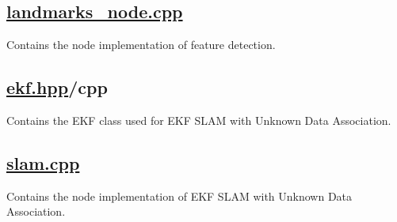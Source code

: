 \subsection*{\hyperlink{landmarks__node_8cpp}{landmarks\+\_\+node.\+cpp}}

Contains the node implementation of feature detection.

\subsection*{\hyperlink{ekf_8hpp}{ekf.\+hpp}/cpp}

Contains the E\+KF class used for E\+KF S\+L\+AM with Unknown Data Association.

\subsection*{\hyperlink{slam_8cpp}{slam.\+cpp}}

Contains the node implementation of E\+KF S\+L\+AM with Unknown Data Association. 